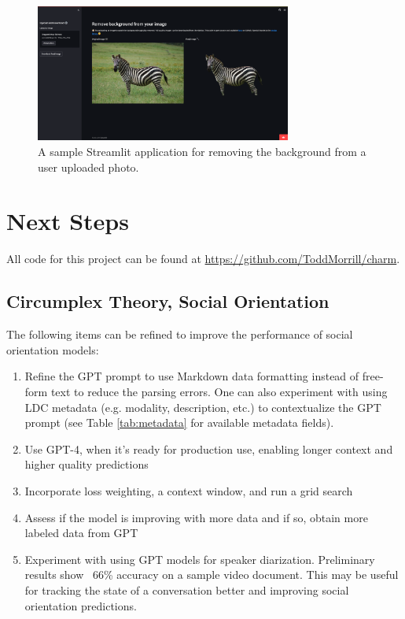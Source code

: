 \documentclass[12pt]{article}
\begin{document}
\begin{figure}[H]
    \centering
    \includegraphics[width=0.75\textwidth]{./analysis/streamlit.png}
    \caption{A sample Streamlit application for removing the background from a user uploaded photo.}
    \label{fig:streamlit_app}
\end{figure}

\section{Next Steps}
All code for this project can be found at \url{https://github.com/ToddMorrill/charm}.

\subsection{Circumplex Theory, Social Orientation}
The following items can be refined to improve the performance of social orientation models:
\begin{enumerate}
    \item Refine the GPT prompt to use Markdown data formatting instead of free-form text to reduce the parsing errors. One can also experiment with using LDC metadata (e.g. modality, description, etc.) to contextualize the GPT prompt (see Table \ref{tab:metadata} for available metadata fields).
    \item Use GPT-4, when it's ready for production use, enabling longer context and higher quality predictions
    \item Incorporate loss weighting, a context window, and run a grid search
    \item Assess if the model is improving with more data and if so, obtain more labeled data from GPT
    \item Experiment with using GPT models for speaker diarization. Preliminary results show ~66\% accuracy on a sample video document. This may be useful for tracking the state of a conversation better and improving social orientation predictions.
\end{enumerate}
\end{document}
